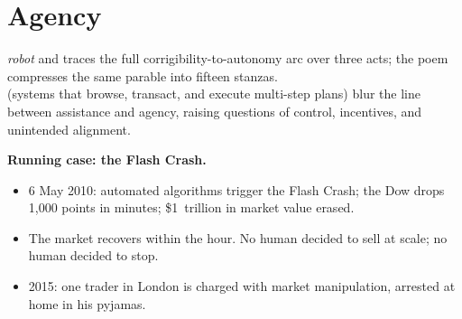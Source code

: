 \chapter{Agency}




 \emph{robot} and traces the full
corrigibility-to-autonomy arc over three acts; the poem compresses the same parable
into fifteen stanzas.\\

 (systems that browse, transact, and execute multi-step
plans) blur the line between assistance and agency, raising questions of control,
incentives, and unintended alignment.

\medskip
\noindent\textbf{Running case: the Flash Crash.}
\begin{itemize}
    \item 6 May 2010: automated algorithms trigger the Flash Crash;
          the Dow drops 1{,}000 points in minutes; \$1~trillion in
          market value erased.
    \item The market recovers within the hour. No human decided to
          sell at scale; no human decided to stop.
    \item 2015: one trader in London is charged with market
          manipulation, arrested at home in his pyjamas.
\end{itemize}

